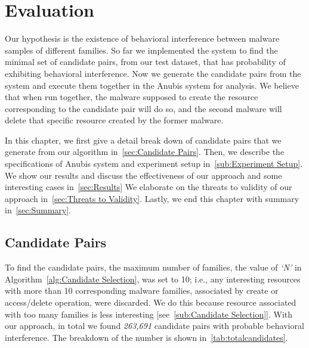 \chapter{Evaluation}
\label{chapter:evaluation}
Our hypothesis is the existence of behavioral interference between malware samples of different families.
So far we implemented the system to find the minimal set of candidate pairs, from our test dataset, that has probability of exhibiting behavioral interference.
Now we generate the candidate pairs from the system and execute them together in the Anubis system for analysis.
We believe that when run together, the malware supposed to create the resource corresponding to the candidate pair will do so, and the second malware will delete that specific resource created by the former malware.

In this chapter, we first give a detail break down of candidate pairs that we generate from our algorithm in~\autoref{sec:Candidate Pairs}.
Then, we describe the specifications of Anubis system and experiment setup in~\autoref{sub:Experiment Setup}.
We show our results and discuss the effectiveness of our approach and some interesting cases in~\autoref{sec:Results}
We elaborate on the threats to validity of our approach in~\autoref{sec:Threats to Validity}.
Lastly, we end this chapter with summary in~\autoref{sec:Summary}.

\section{Candidate Pairs}
\label{sec:Candidate Pairs}
To find the candidate pairs, the maximum number of families, the value of \emph{`N'} in Algorithm~\autoref{alg:Candidate Selection}, was set to 10;
i.e., any interesting resources with more than 10 corresponding malware families, associated by create or access/delete operation, were discarded.
We do this because resource associated with too many families is less interesting [see~\autoref{sub:Candidate Selection}].
With our approach, in total we found \emph{263,691} candidate pairs with probable behavioral interference.
The breakdown of the number is shown in~\autoref{tab:totalcandidates}.

